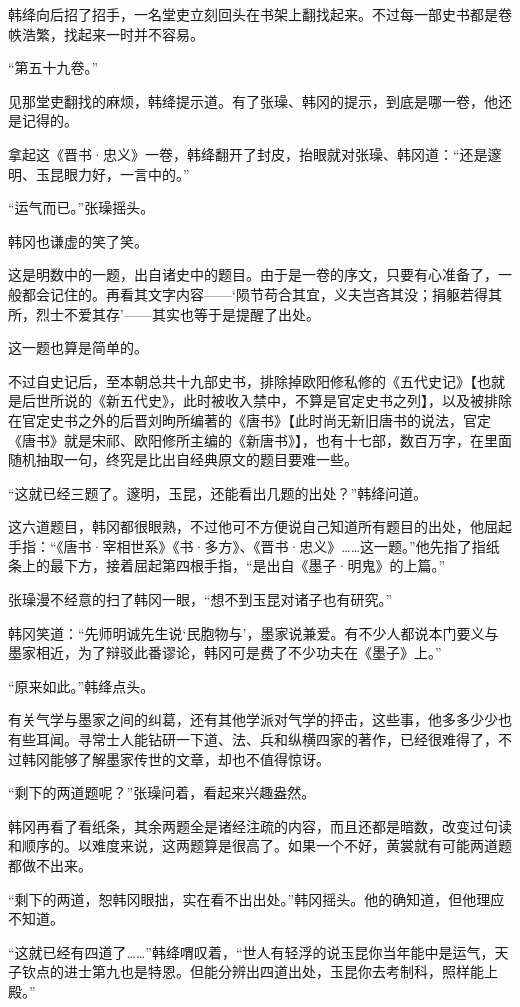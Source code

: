 韩绛向后招了招手，一名堂吏立刻回头在书架上翻找起来。不过每一部史书都是卷帙浩繁，找起来一时并不容易。

“第五十九卷。”

见那堂吏翻找的麻烦，韩绛提示道。有了张璪、韩冈的提示，到底是哪一卷，他还是记得的。

拿起这《晋书·忠义》一卷，韩绛翻开了封皮，抬眼就对张璪、韩冈道：“还是邃明、玉昆眼力好，一言中的。”

“运气而已。”张璪摇头。

韩冈也谦虚的笑了笑。

这是明数中的一题，出自诸史中的题目。由于是一卷的序文，只要有心准备了，一般都会记住的。再看其文字内容——‘陨节苟合其宜，义夫岂吝其没；捐躯若得其所，烈士不爱其存’——其实也等于是提醒了出处。

这一题也算是简单的。

不过自史记后，至本朝总共十九部史书，排除掉欧阳修私修的《五代史记》【也就是后世所说的《新五代史》，此时被收入禁中，不算是官定史书之列】，以及被排除在官定史书之外的后晋刘昫所编著的《唐书》【此时尚无新旧唐书的说法，官定《唐书》就是宋祁、欧阳修所主编的《新唐书》】，也有十七部，数百万字，在里面随机抽取一句，终究是比出自经典原文的题目要难一些。

“这就已经三题了。邃明，玉昆，还能看出几题的出处？”韩绛问道。

这六道题目，韩冈都很眼熟，不过他可不方便说自己知道所有题目的出处，他屈起手指：“《唐书·宰相世系》《书·多方》、《晋书·忠义》……这一题。”他先指了指纸条上的最下方，接着屈起第四根手指，“是出自《墨子·明鬼》的上篇。”

张璪漫不经意的扫了韩冈一眼，“想不到玉昆对诸子也有研究。”

韩冈笑道：“先师明诚先生说‘民胞物与’，墨家说兼爱。有不少人都说本门要义与墨家相近，为了辩驳此番谬论，韩冈可是费了不少功夫在《墨子》上。”

“原来如此。”韩绛点头。

有关气学与墨家之间的纠葛，还有其他学派对气学的抨击，这些事，他多多少少也有些耳闻。寻常士人能钻研一下道、法、兵和纵横四家的著作，已经很难得了，不过韩冈能够了解墨家传世的文章，却也不值得惊讶。

“剩下的两道题呢？”张璪问着，看起来兴趣盎然。

韩冈再看了看纸条，其余两题全是诸经注疏的内容，而且还都是暗数，改变过句读和顺序的。以难度来说，这两题算是很高了。如果一个不好，黄裳就有可能两道题都做不出来。

“剩下的两道，恕韩冈眼拙，实在看不出出处。”韩冈摇头。他的确知道，但他理应不知道。

“这就已经有四道了……”韩绛喟叹着，“世人有轻浮的说玉昆你当年能中是运气，天子钦点的进士第九也是特恩。但能分辨出四道出处，玉昆你去考制科，照样能上殿。”

